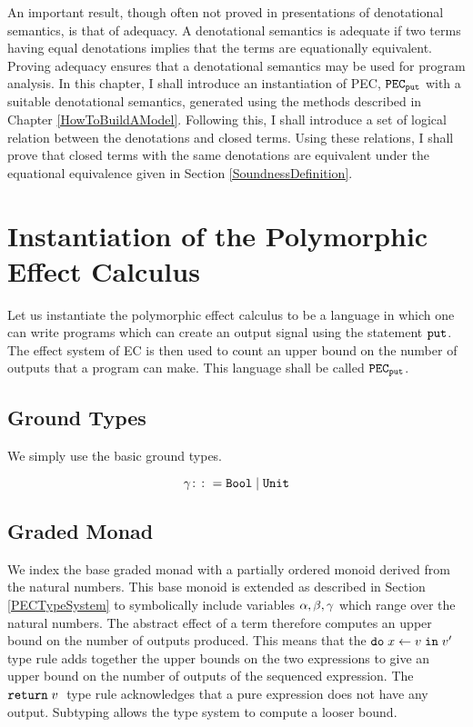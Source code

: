 

    An important result, though often not proved in presentations of denotational semantics, is that of adequacy. A denotational semantics is adequate if two terms having equal denotations implies that the terms are equationally equivalent. Proving adequacy ensures that a denotational semantics may be used for program analysis. In this chapter, I shall introduce an instantiation of PEC,  $\texttt{PEC}_{\texttt{put}}$ with a suitable denotational semantics, generated using the methods described in Chapter \ref{HowToBuildAModel}. Following this, I shall introduce a set of logical relation between the denotations and closed terms. Using these relations, I shall prove that closed terms with the same denotations are equivalent under the equational equivalence given in Section \ref{SoundnessDefinition}.

    \section{Instantiation of the Polymorphic Effect Calculus}
    Let us instantiate the polymorphic effect calculus to be a language in which one can write programs which can create an output signal using the statement $\texttt{put}$. The effect system of EC is then used to count an upper bound on the number of outputs that a program can make. This language shall be called $\texttt{PEC}_{\texttt{put}}$.

    \subsection{Ground Types}
    We simply use the basic ground types.

    \begin{equation}
        \label{AdequacyGroundTypes}
        \gamma \colon\colon= \texttt{Bool} \mid \texttt{Unit}
    \end{equation}

    \subsection{Graded Monad}
    We index the base graded monad with a partially ordered monoid derived from the natural numbers. This base monoid is extended as described in Section \ref{PECTypeSystem} to symbolically include variables $\alpha, \beta, \gamma$ which range over the natural numbers. The abstract effect of a term therefore computes an upper bound on the number of outputs produced.  This means that the $\texttt{do}\; x \leftarrow v \;\texttt{in}\; v'\;$ type rule adds together the upper bounds on the two expressions to give an upper bound on the number of outputs of the sequenced expression. The $\texttt{return} \; v\;$ type rule acknowledges that a pure expression does not have any output. Subtyping  allows the type system to compute a looser bound.
    
